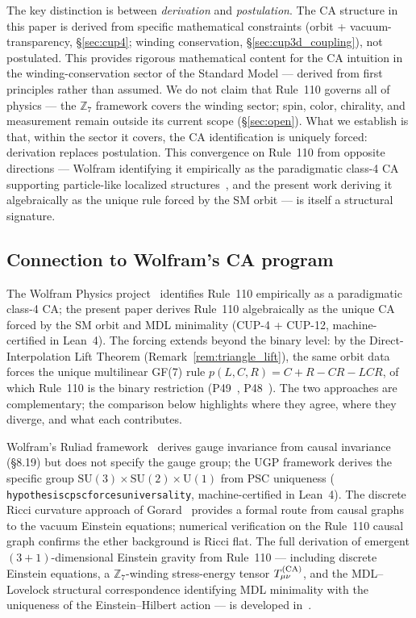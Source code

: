 \documentclass[11pt]{article}
\theoremstyle{remark}
\newcommand{\lean}[1]{%
  \penalty-100
  \begingroup\def\_{\textunderscore\allowbreak}\texttt{#1}\endgroup}
\begin{document}
The key distinction is between \emph{derivation} and \emph{postulation}. The CA structure
in this paper is derived from specific mathematical constraints (orbit + vacuum-transparency,
\S\ref{sec:cup4}; winding conservation, \S\ref{sec:cup3d_coupling}), not postulated.
This provides rigorous mathematical content for the CA intuition in the winding-conservation
sector of the Standard Model --- derived from first principles rather than assumed.
We do not claim that Rule~110 governs all of physics --- the $\mathbb{Z}_7$ framework
covers the winding sector; spin, color, chirality, and measurement remain outside its
current scope (\S\ref{sec:open}). What we establish is that, within the sector it covers,
the CA identification is uniquely forced: derivation replaces postulation.
This convergence on Rule~110 from opposite directions --- Wolfram identifying it empirically
as the paradigmatic class-4 CA supporting particle-like localized structures~\cite{Wolfram2020Tech},
and the present work deriving it algebraically as the unique rule forced by the SM orbit ---
is itself a structural signature.

\subsection{Connection to Wolfram's CA program}
\label{par:wolfram_compare}
The Wolfram Physics project~\cite{Wolfram2020Tech} identifies Rule~110 empirically as a
paradigmatic class-4 CA; the present paper derives Rule~110 algebraically as the unique CA
forced by the SM orbit and MDL minimality (CUP-4 + CUP-12, machine-certified in Lean~4).
The forcing extends beyond the binary level: by the Direct-Interpolation Lift Theorem
(Remark~\ref{rem:triangle_lift}), the same orbit data forces the unique multilinear
GF(7) rule $p(L,C,R) = C + R - CR - LCR$, of which Rule~110 is the binary restriction
(P49~\cite{SpivackGTEPolynomialWolfram}, P48~\cite{SpivackGTECompleteFramework}).
The two approaches are complementary; the comparison below highlights where they agree,
where they diverge, and what each contributes.

Wolfram's Ruliad framework~\cite{Wolfram2020Tech} derives gauge invariance from causal invariance
(\S8.19) but does not specify the gauge group; the UGP framework derives the specific group
$\mathrm{SU}(3)\!\times\!\mathrm{SU}(2)\!\times\!\mathrm{U}(1)$ from PSC uniqueness
(\lean{hypothesis\_c\_psc\_forces\_universality}, machine-certified in Lean~4).
The discrete Ricci curvature approach of Gorard~\cite{Gorard2020Rel} provides a formal route
from causal graphs to the vacuum Einstein equations; numerical verification on the Rule~110
causal graph confirms the ether background is Ricci flat.
The full derivation of emergent $(3+1)$-dimensional Einstein gravity from Rule~110 ---
including discrete Einstein equations, a $\mathbb{Z}_7$-winding stress-energy tensor
$T_{\mu\nu}^{(\rm CA)}$, and the MDL--Lovelock structural correspondence identifying
MDL minimality with the uniqueness of the Einstein--Hilbert action --- is developed
in~\cite{SpivackEmergentGravity}.
\end{document}
